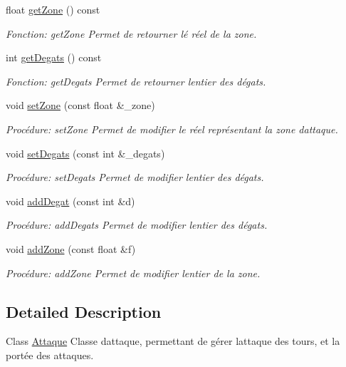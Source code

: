 \begin{DoxyCompactItemize}
float \hyperlink{classAttaque_a09a146b30b7df667382ef5884dc2635a}{get\+Zone} () const
\begin{DoxyCompactList}\small\item\em Fonction\+: get\+Zone Permet de retourner lé réel de la zone. \end{DoxyCompactList}\item 
int \hyperlink{classAttaque_aa98722a177e1f01df81dd6bf8fc88799}{get\+Degats} () const
\begin{DoxyCompactList}\small\item\em Fonction\+: get\+Degats Permet de retourner l\textquotesingle{}entier des dégats. \end{DoxyCompactList}\item 
void \hyperlink{classAttaque_ae6dc5afd850f4518e937b8a2c08ac764}{set\+Zone} (const float \&\+\_\+zone)
\begin{DoxyCompactList}\small\item\em Procédure\+: set\+Zone Permet de modifier le réel représentant la zone d\textquotesingle{}attaque. \end{DoxyCompactList}\item 
void \hyperlink{classAttaque_ad1af4e5ae848c40c7879fa4f9a56c674}{set\+Degats} (const int \&\+\_\+degats)
\begin{DoxyCompactList}\small\item\em Procédure\+: set\+Degats Permet de modifier l\textquotesingle{}entier des dégats. \end{DoxyCompactList}\item 
void \hyperlink{classAttaque_a47b0b804d6533953ed18fc8239f2cc1d}{add\+Degat} (const int \&d)
\begin{DoxyCompactList}\small\item\em Procédure\+: add\+Degats Permet de modifier l\textquotesingle{}entier des dégats. \end{DoxyCompactList}\item 
void \hyperlink{classAttaque_a1d4ca211e47b04d97bed004af117b550}{add\+Zone} (const float \&f)
\begin{DoxyCompactList}\small\item\em Procédure\+: add\+Zone Permet de modifier l\textquotesingle{}entier de la zone. \end{DoxyCompactList}\end{DoxyCompactItemize}


\subsection{Detailed Description}
Class \hyperlink{classAttaque}{Attaque} Classe d\textquotesingle{}attaque, permettant de gérer l\textquotesingle{}attaque des tours, et la portée des attaques. 

